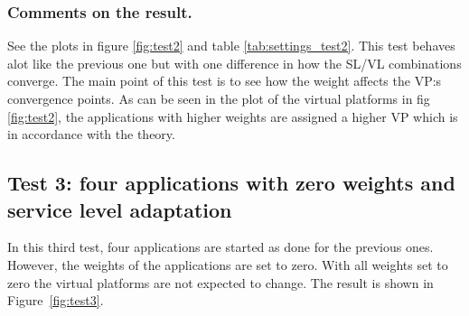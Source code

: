 \documentclass[nobiblatex]{LTHthesis}
\begin{document}
\subsubsection{Comments on the result.} 
See the plots in figure \ref{fig:test2} and table \ref{tab:settings_test2}.
This test behaves alot like the previous one but with one difference in how 
the SL/VL combinations converge. The main point of this test is to see how the 
weight affects the VP:s convergence points.
As can be seen in the plot of the virtual platforms in fig \ref{fig:test2}, 
the applications with higher weights are assigned a higher VP which is in 
accordance with the theory.

\subsection{Test 3: four applications with zero weights and 
  service level adaptation}

In this third test, four applications are started as done for the previous
ones. However, the weights of the applications are set to zero. With all
weights set to zero the virtual platforms are not expected to change.
The result is shown in Figure~\ref{fig:test3}.
\end{document}
